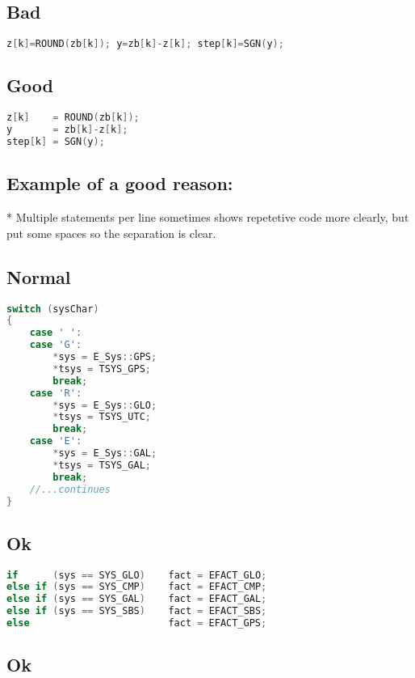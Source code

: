 \subsection{Bad}
\begin{lstlisting}[language=c++]
z[k]=ROUND(zb[k]); y=zb[k]-z[k]; step[k]=SGN(y);
\end{lstlisting}

\subsection{Good}

\begin{lstlisting}[language=c++]
z[k]    = ROUND(zb[k]);
y       = zb[k]-z[k]; 
step[k] = SGN(y);
\end{lstlisting}

\subsection{Example of a good reason:}

* Multiple statements per line sometimes shows repetetive code more clearly, but put some spaces so the separation is clear.

\subsection{Normal}

\begin{lstlisting}[language=c++]
switch (sysChar)
{
    case ' ':
    case 'G': 
        *sys = E_Sys::GPS; 
        *tsys = TSYS_GPS; 
        break;
    case 'R': 
        *sys = E_Sys::GLO;  
        *tsys = TSYS_UTC; 
        break;
    case 'E': 
        *sys = E_Sys::GAL;  
        *tsys = TSYS_GAL; 
        break;
    //...continues
}
\end{lstlisting}

\subsection{Ok}

\begin{lstlisting}[language=c++]
if      (sys == SYS_GLO)    fact = EFACT_GLO;
else if (sys == SYS_CMP)    fact = EFACT_CMP;
else if (sys == SYS_GAL)    fact = EFACT_GAL;
else if (sys == SYS_SBS)    fact = EFACT_SBS;
else                        fact = EFACT_GPS;
\end{lstlisting}

\subsection{Ok}	


